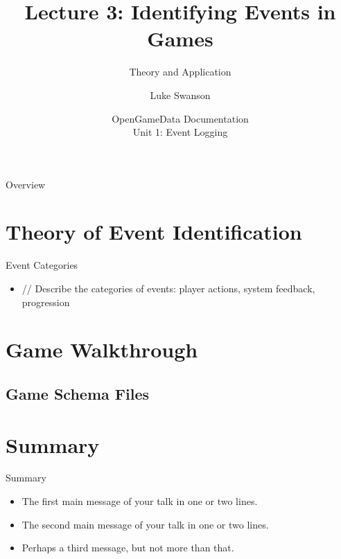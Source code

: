 \documentclass{beamer}
\title[Identifying Events] %
{Lecture 3: Identifying Events in Games}
\subtitle
{Theory and Application} %
\author[Swanson] %
{Luke Swanson}
\institute[University of Wisconsin-Madison] %
{
  Field Day Lab\\
  University of Wisconsin-Madison
}
\date[OGD Docs] %
{OpenGameData Documentation \\ Unit 1: Event Logging}
\begin{document}
\begin{frame}
  \titlepage
\end{frame}

\begin{frame}{Overview}
  \tableofcontents
\end{frame}




\section[Event Theory]{Theory of Event Identification}

\begin{frame}{Event Categories}
  \begin{itemize}
  \item
    // Describe the categories of events: player actions, system feedback, progression
    \pause
  \end{itemize}
\end{frame}

\section[Walkthrough]{Game Walkthrough}

\subsection[Schema Files]{Game Schema Files}

\section*{Summary}

\begin{frame}{Summary}
  \begin{itemize}
  \item
    The \alert{first main message} of your talk in one or two lines.
  \item
    The \alert{second main message} of your talk in one or two lines.
  \item
    Perhaps a \alert{third message}, but not more than that.
  \end{itemize}
\end{frame}
\end{document}
